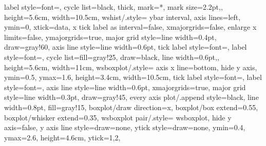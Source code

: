 {{    label style={font=\small},
    cycle list={{black, thick, mark=*, mark size=2.2pt},},
    height=5.6cm, width=10.5cm},
  wshist/.style={
    ybar interval, axis lines=left, ymin=0,
    xtick=data,
    x tick label as interval=false,
    xmajorgrids=false, enlarge x limits=false,
    ymajorgrids=true,
    major grid style={line width=0.4pt, draw=gray!60},
    axis line style={line width=0.6pt},
    tick label style={font=\small},
    label style={font=\small},
    cycle list={{fill=gray!25, draw=black, line width=0.6pt},},
    height=5.6cm, width=11cm},
  wsboxplot/.style={
    axis x line=bottom,
    hide y axis,
    ymin=0.5, ymax=1.6,
    height=3.4cm, width=10.5cm,
    tick label style={font=\small},
    label style={font=\small},
    axis line style={line width=0.6pt},
    xmajorgrids=true,
    major grid style={line width=0.3pt, draw=gray!45},
    every axis plot/.append style={black, line width=0.8pt, fill=gray!15},
    boxplot/draw direction=x,
    boxplot/box extend=0.55,
    boxplot/whisker extend=0.35},
  wsboxplot pair/.style={
    wsboxplot,
    hide y axis=false,
    y axis line style={draw=none},
    ytick style={draw=none},
    ymin=0.4, ymax=2.6,
    height=4.6cm,
    ytick={1,2}},
}

